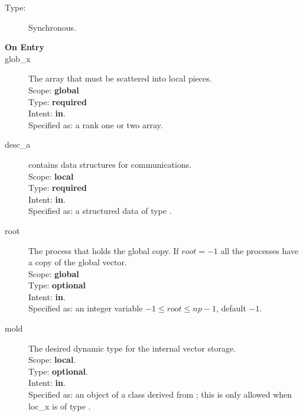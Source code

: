 \begin{description}
\item[Type:] Synchronous.
\item[\bf On Entry]
\item[glob\_x] The array that must be scattered into local pieces.\\
Scope: {\bf global} \\
Type: {\bf required}\\
Intent: {\bf in}.\\
Specified as: a rank one or two array.
\item[desc\_a] contains data structures for communications.\\
Scope: {\bf local} \\
Type: {\bf required}\\
Intent: {\bf in}.\\
Specified as: a structured data of type \descdata.
\item[root]  The process that holds the global copy. If $root=-1$ all
  the processes have a copy of the global vector.\\
Scope: {\bf global} \\
Type: {\bf optional}\\
Intent: {\bf in}.\\
Specified as: an integer variable $-1\le root\le np-1$, default $-1$. 
\item[mold] The desired dynamic type for the internal vector storage.\\
Scope: {\bf local}.\\
Type: {\bf optional}.\\
Intent: {\bf in}.\\
Specified as: an object of a class derived from \vbasedata; this is
only allowed when loc\_x is of type \vdata.

\end{description}

